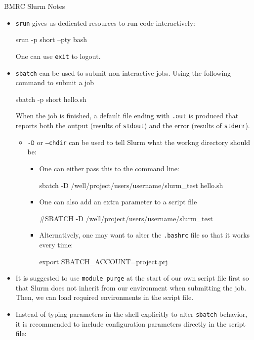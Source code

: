 \documentclass[UTF8]{book}
\date{}
\newcommand{\code}[1]{\colorbox{codegray}{\texttt{#1}}}
\begin{document}
\begin{center}
\Large{BMRC Slurm Notes}
\end{center}
\begin{itemize}
\item \code{srun} gives us dedicated resources to run code interactively:
\begin{bash}
srun -p short --pty bash
\end{bash}
One can use \code{exit} to logout.
\item \code{sbatch} can be used to submit non-interactive jobs. Using the following command to submit a job
\begin{bash}
sbatch -p short hello.sh
\end{bash}
When the job is finished, a default file ending with \code{.out} is produced that reports both the output (results of \code{stdout}) and the error (results of \code{stderr}).
\begin{itemize}
	\item \code{-D} or \code{--chdir} can be used to tell Slurm what the workng directory should be:
	\begin{itemize}
		\item One can either pass this to the command line:
\begin{bash}
sbatch -D /well/project/users/username/slurm_test hello.sh
\end{bash}
		\item One can also add an extra parameter to a script file
\begin{bash}
#SBATCH -D /well/project/users/username/slurm_test
\end{bash}
		\item Alternatively, one may want to alter the \code{.bashrc} file so that it works every time:
\begin{bash}
export SBATCH_ACCOUNT=project.prj 
\end{bash}
	\end{itemize}
\end{itemize}
\item It is suggested to use \code{module purge} at the start of our own script file first so that Slurm does not inherit from our environment when submitting the job. Then, we can load required environments in the script file.
\item Instead of typing parameters in the shell explicitly to alter \code{sbatch} behavior, it is recommended to include configuration parameters directly in the script file:
\begin{bash}

\end{bash}
\end{itemize}
\end{document}
